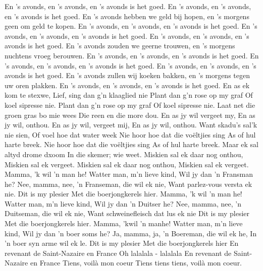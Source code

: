 \documentclass{article}
\begin{document}
\begin{songs}{}
\begin{intersong}
\end{intersong}
\beginverse*
En 's avonds, en 's avonds, en 's avonds is het goed.
En 's avonds, en 's avonds, en 's avonds is het goed.
En 's avonds hebben we geld bij hopen,
en 's morgens geen om geld te kopen.
En 's avonds, en 's avonds, en 's avonds is het goed.
\endverse
\beginverse*
En 's avonds, en 's avonds, en 's avonds is het goed.
En 's avonds, en 's avonds, en 's avonds is het goed.
En 's avonds zouden we geerne trouwen,
en 's morgens nuchtens vroeg berouwen.
En 's avonds, en 's avonds, en 's avonds is het goed.
\endverse
\beginverse*
En 's avonds, en 's avonds, en 's avonds is het goed.
En 's avonds, en 's avonds, en 's avonds is het goed.
En 's avonds zullen wij koeken bakken,
en 's morgens tegen uw oren plakken.
En 's avonds, en 's avonds, en 's avonds is het goed.
\endverse
\endsong
{}
\beginverse*
En as ek kom te stexwe,
Lief, sing dan g'n klaaglied nie
Plant dan g'n rose op my graf
Of koel sipresse nie.
Plant dan g'n rose op my graf
Of koel sipresse nie.
\endverse
\beginverse*
Laat net die groen gras bo mie wees
Die reen en die more dou.
En as jy wil vergeet my,
En as jy wil, onthou.
En as jy wil, vergeet mij,
En as jy wil, onthou.
\endverse
\beginverse*
Want skadu's sal'k nie sien,
Of voel hoe dat water week
Nie hoor hoe dat die voëltjies sing
As of hul harte breek.
Nie hoor hoe dat die voëltjies sing
As of hul harte breek.
\endverse
\beginverse*
Maar ek sal altyd drome dxoom
In die skemer; wie weet.
Miskien sal ek daar nog onthou,
Miskien sal ek vergeet.
Miskien sal ek daar nog onthou,
Miskien sal ek vergeet.
\endverse
\endsong
{}
\beginverse*
Mamma, 'k wil 'n man he!
Watter man, m'n lieve kind,
Wil jy dan 'n Fransman he?
Nee, mamma, nee,
'n Franseman, die wil ek nie,
Want parlez-vous versta ek nie.
Dit is my plesier
Met die boerjongkerels hier.
\endverse
\beginverse*
Mamma, 'k wil 'n man he!
Watter man, m'n lieve kind,
Wil jy dan 'n Duitser he?
Nee, mamma, nee,
'n Duitseman, die wil ek nie,
Want schweinefleisch dat lus ek nie
Dit is my plesier
Met die boerjongkerels hier.
\endverse
\beginverse*
Mamma, 'kwil 'n manhe!
Watter man, m'n lieve kind,
Wil jy dan 'n boer soms he?
Ja, mamma, ja,
'n Boereman, die wil ek he,
In 'n boer syn arme wil ek le.
Dit is my plesier
Met die boerjongkerels hier
\endverse
\endsong
{}
\beginverse*
En revenant de Saint-Nazaire en France
Oh lalalala - lalalala
En revenant de Saint-Nazaire en France
Tiens, voilà mon coeur
Tiens tiens tiens, voilà mon coeur.

\end{songs}
\end{document}
